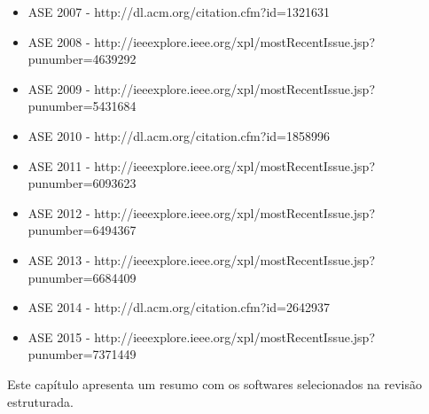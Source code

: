\begin{itemize}
  \item ASE 2007 - {\small http://dl.acm.org/citation.cfm?id=1321631}
  \item ASE 2008 - {\small http://ieeexplore.ieee.org/xpl/mostRecentIssue.jsp?punumber=4639292}
  \item ASE 2009 - {\small http://ieeexplore.ieee.org/xpl/mostRecentIssue.jsp?punumber=5431684}
  \item ASE 2010 - {\small http://dl.acm.org/citation.cfm?id=1858996}
  \item ASE 2011 - {\small http://ieeexplore.ieee.org/xpl/mostRecentIssue.jsp?punumber=6093623}
  \item ASE 2012 - {\small http://ieeexplore.ieee.org/xpl/mostRecentIssue.jsp?punumber=6494367}
  \item ASE 2013 - {\small http://ieeexplore.ieee.org/xpl/mostRecentIssue.jsp?punumber=6684409}
  \item ASE 2014 - {\small http://dl.acm.org/citation.cfm?id=2642937}
  \item ASE 2015 - {\small http://ieeexplore.ieee.org/xpl/mostRecentIssue.jsp?punumber=7371449}
\end{itemize}

{Este capítulo apresenta um resumo com os softwares selecionados na revisão
estruturada.}
\label{softwares-cientificos}

